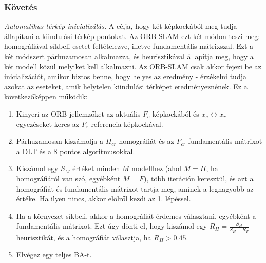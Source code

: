\subsubsection{Követés}

\textit{Automatikus térkép inicializálás.} A célja, hogy két képkockából meg tudja állapítani a kiindulási térkép pontokat.
Az ORB-SLAM ezt két módon teszi meg: homográfiával síkbeli esetet feltételezve, illetve fundamentális mátrixszal.
Ezt a két módszert párhuzamosan alkalmazza, és heurisztikával állapítja meg, hogy a két modell közül melyiket kell alkalmazni.
Az ORB-SLAM csak akkor fejezi be az inicializációt, amikor biztos benne, hogy helyes az eredmény - érzékelni tudja azokat az eseteket, amik helytelen kiindulási térképet eredményeznének.
Ez a következőképpen működik:
\begin{enumerate}
	\item Kinyeri az ORB jellemzőket az aktuális $F_c$ képkockából és $x_c \leftrightarrow x_r$ egyezéseket keres az $F_r$ referencia képkockával.
	\item Párhuzamosan kiszámolja a $H_{cr}$ homográfiát és az $F_{cr}$ fundamentális mátrixot a DLT és a 8 pontos algoritmusokkal.
	\item Kiszámol egy $S_M$ értéket minden $M$ modellhez (ahol $M = H$, ha homográfiáról van szó, egyébként $M = F$), több iteráción keresztül, és azt a homográfiát és fundamentális mátrixot tartja meg, aminek a legnagyobb az értéke. Ha ilyen nincs, akkor elölről kezdi az 1. lépéssel.
	\item Ha a környezet síkbeli, akkor a homográfiát érdemes választani, egyébként a fundamentális mátrixot. Ezt úgy dönti el, hogy kiszámol egy $R_H = \frac{S_H}{S_H + R_F}$ heurisztikát, és a homográfiát választja, ha $R_H > 0.45$.
	\item Elvégez egy teljes BA-t.
\end{enumerate}

